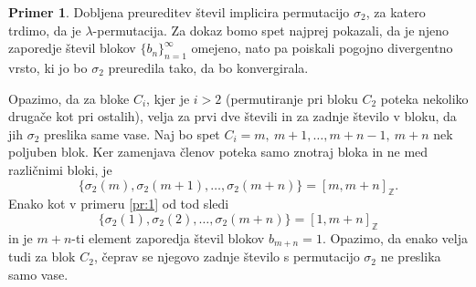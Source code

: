 \documentclass[12pt,a4paper,reqno]{amsart}
\theoremstyle{definition} %
\newtheorem{primer}[definicija]{Primer}
\theoremstyle{plain} %
\newcommand{\Z}{\mathbb Z}
\begin{document}
\begin{primer}
Dobljena preureditev števil implicira permutacijo $\sigma_2$, za katero trdimo, da je $\lambda$-permutacija. Za dokaz bomo spet najprej pokazali, da je njeno zaporedje števil blokov $\{b_n\}_{n=1}^{\infty}$ omejeno, nato pa poiskali pogojno divergentno vrsto, ki jo bo $\sigma_2$ preuredila tako, da bo konvergirala.

Opazimo, da za bloke $C_i$, kjer je $i>2$ (permutiranje pri bloku $C_2$ poteka nekoliko drugače kot pri ostalih), velja za prvi dve števili in za zadnje število v bloku, da jih $\sigma_2$ preslika same vase. Naj bo spet $C_i = m,\ m+1, \dots, m+n-1,\ m+n$ nek poljuben blok. Ker zamenjava členov poteka samo znotraj bloka in ne med različnimi bloki, je $$\{\sigma_2(m), \sigma_2(m+1), \ldots, \sigma_2(m+n) \}=[m,m+n]_{\Z}.$$ Enako kot v primeru \ref{pr:1} od tod sledi $$\{\sigma_2(1), \sigma_2(2), \ldots, \sigma_2(m+n) \}=[1,m+n]_{\Z}$$
in je $m+n$-ti element zaporedja števil blokov $b_{m+n}=1$. Opazimo, da enako velja tudi za blok $C_2$, čeprav se njegovo zadnje število s permutacijo $\sigma_2$ ne preslika samo vase.


\end{primer}
\end{document}
